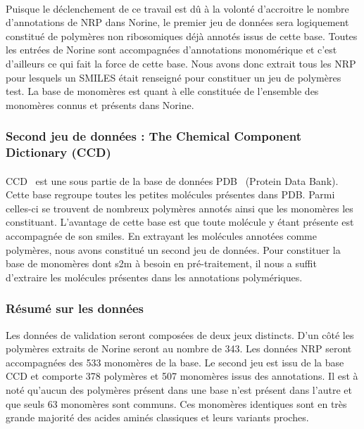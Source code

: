 \documentclass[12pt,french,twoside]{report}
\begin{document}
\paragraph{}Puisque le déclenchement de ce travail est dû à la volonté d'accroitre le nombre d'annotations de NRP dans Norine, le premier jeu de données sera logiquement constitué de polymères non ribosomiques déjà annotés issus de cette base.
Toutes les entrées de Norine sont accompagnées d'annotations monomérique et c'est d'ailleurs ce qui fait la force de cette base.
Nous avons donc extrait tous les NRP pour lesquels un SMILES était renseigné pour constituer un jeu de polymères test.
La base de monomères est quant à elle constituée de l'ensemble des monomères connus et présents dans Norine.


\subsubsection{Second jeu de données : The Chemical Component Dictionary (CCD)}

\paragraph{}CCD~\cite{westbrook_chemical_2015} est une sous partie de la base de données PDB~\cite{berman_protein_2000} (Protein Data Bank).
Cette base regroupe toutes les petites molécules présentes dans PDB.
Parmi celles-ci se trouvent de nombreux polymères annotés ainsi que les monomères les constituant.
L'avantage de cette base est que toute molécule y étant présente est accompagnée de son smiles.
En extrayant les molécules annotées comme polymères, nous avons constitué un second jeu de données.
Pour constituer la base de monomères dont s2m à besoin en pré-traitement, il nous a suffit d'extraire les molécules présentes dans les annotations polymériques.


\subsubsection{Résumé sur les données}

Les données de validation seront composées de deux jeux distincts.
D'un côté les polymères extraits de Norine seront au nombre de 343.
Les données NRP seront accompagnées des 533 monomères de la base.
Le second jeu est issu de la base CCD et comporte 378 polymères et 507 monomères issus des annotations.
Il est à noté qu'aucun des polymères présent dans une base n'est présent dans l'autre et que seuls 63 monomères sont communs.
Ces monomères identiques sont en très grande majorité des acides aminés classiques et leurs variants proches.
\end{document}
